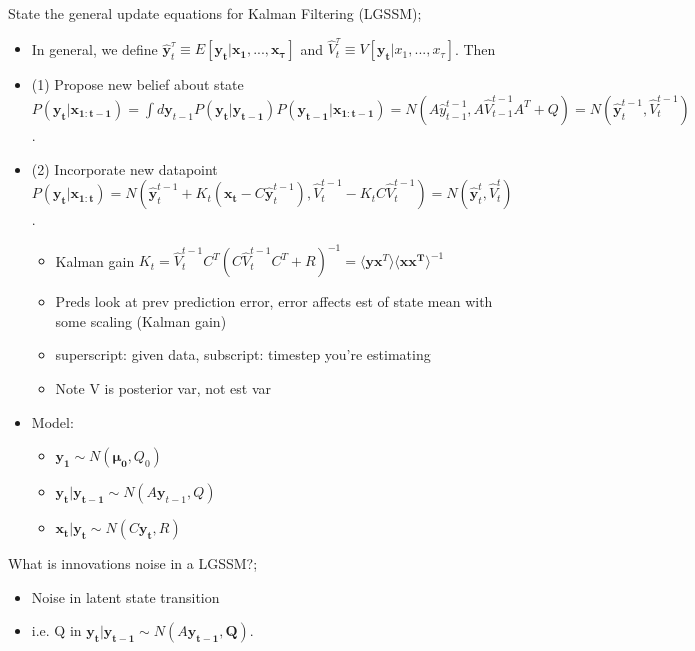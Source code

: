 \documentclass{article}
\begin{document}
State the general update equations for Kalman Filtering (LGSSM); \begin{itemize}
    \item In general, we define $\hat{\mathbf{y}}^\tau_t \equiv E[\mathbf{y_t|x_1,...,x_\tau}]$ and $\hat{V}^\tau_t \equiv V[\mathbf{y_t}|x_1,...,x_\tau]$. Then
        \item (1) Propose new belief about state $P(\mathbf{y_t|x_{1:t-1}})=\int d\mathbf{y}_{t-1}P(\mathbf{y_t|y_{t-1}})P(\mathbf{y_{t-1}|x_{1:t-1}})=N(A\hat{y}^{t-1}_{t-1}, A\hat{V}^{t-1}_{t-1}A^T+Q)=N(\hat{\mathbf{y}}^{t-1}_t, \hat{V}^{t-1}_t)$.
        \item (2) Incorporate new datapoint $P(\mathbf{y_t|x_{1:t}})=N(\hat{\mathbf{y}}^{t-1}_t+K_t(\mathbf{x_t}-C\mathbf{\hat{y}}^{t-1}_t), \hat{V}^{t-1}_t - K_tC\hat{V}^{t-1}_t)=N(\mathbf{\hat{y}}^t_t, \hat{V}^t_t)$.
        \begin{itemize}
            \item Kalman gain $K_t = \hat{V}^{t-1}_tC^T(C\hat{V}^{t-1}_tC^T+R)^{-1} = \langle \mathbf{yx}^T \rangle \langle \mathbf{xx^T} \rangle^{-1}$
            \item Preds look at prev prediction error, error affects est of state mean with some scaling (Kalman gain)
        \end{itemize}
        \begin{itemize}
        \item superscript: given data, subscript: timestep you're estimating
        \item Note V is posterior var, not est var
    \end{itemize}
        \item Model: \begin{itemize}
            \item $\mathbf{y_1}\sim N(\mathbf{\mu_0},Q_0)$
            \item $\mathbf{y_t|y_{t-1}}\sim N(A\mathbf{y}_{t-1}, Q)$
            \item $\mathbf{x_t|y_t}\sim N(C\mathbf{y_t},R)$
        \end{itemize}
\end{itemize}

What is innovations noise in a LGSSM?; \begin{itemize}
    \item Noise in latent state transition
    \item i.e. Q in $\mathbf{y_t|y_{t-1}}\sim N(A\mathbf{y_{t-1}, Q})$.
\end{itemize}
\end{document}

